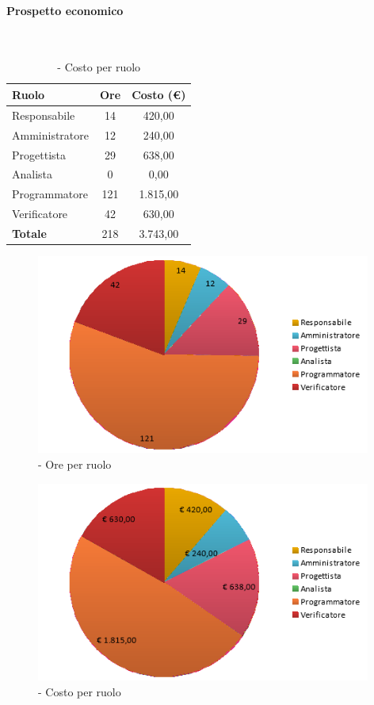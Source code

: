 \documentclass[./PianoDiProgetto.tex]{subfiles}
\begin{document}
	\paragraph{Prospetto economico}\

	\begin{table}[H]
		\centering

		\begin{tabular}{l * {2}{c}}
			\toprule
			\textbf{Ruolo} & \textbf{Ore} & \textbf{Costo (\euro{})} \\
			\midrule
			Responsabile & 14    &  420,00 \\
			Amministratore  & 12    &  240,00 \\
			Progettista  & 29   &  638,00 \\
			Analista & 0    &  0,00 \\
			Programmatore  & 121    &  1.815,00 \\
			Verificatore  & 42    &  630,00 \\
			\midrule
			\textbf{Totale}  & 218   &  3.743,00 \\
			\bottomrule
		\end{tabular}
		\caption{\PerC{} - Costo per ruolo}
	\end{table}

\vspace{35mm}

	\begin{figure}[H]
		\centering
		\includegraphics[width=11cm, trim=1cm 0cm 1cm 0cm]{grafici/C-ruolo}
			\caption{\PerC{} - Ore per ruolo}
	\end{figure}
\vfill
	\begin{figure}[H]
		\centering
		\includegraphics[width=11cm, trim=1cm 0cm 1cm 0cm]{grafici/C-costo}
			\caption{\PerC{} - Costo per ruolo}
	\end{figure}
\end{document}
